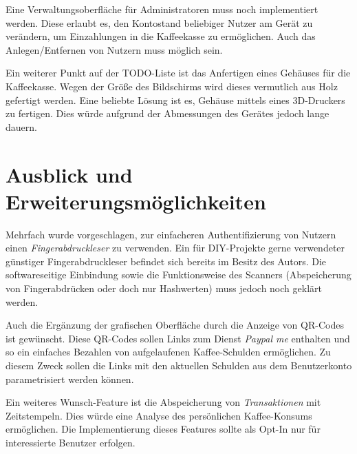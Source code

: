 \documentclass[11pt,a4paper]{IEEEtran}
\begin{document}
Eine Verwaltungsoberfläche für Administratoren muss noch implementiert werden.
Diese erlaubt es, den Kontostand beliebiger Nutzer am Gerät zu verändern, um
Einzahlungen in die Kaffeekasse zu ermöglichen. Auch das Anlegen/Entfernen
von Nutzern muss möglich sein.

Ein weiterer Punkt auf der TODO-Liste ist das Anfertigen eines Gehäuses für die
Kaffeekasse. Wegen der Größe des Bildschirms wird dieses vermutlich aus Holz
gefertigt werden. Eine beliebte Lösung ist es, Gehäuse mittels eines 3D-Druckers
zu fertigen. Dies würde aufgrund der Abmessungen des Gerätes jedoch lange
dauern.

\section{Ausblick und Erweiterungsmöglichkeiten}

Mehrfach wurde vorgeschlagen, zur einfacheren Authentifizierung von Nutzern
einen \emph{Fingerabdruckleser} zu verwenden. Ein für DIY-Projekte gerne 
verwendeter günstiger Fingerabdruckleser befindet sich bereits im Besitz des
Autors. Die softwareseitige Einbindung sowie die Funktionsweise des Scanners
(Abspeicherung von Fingerabdrücken oder doch nur Hashwerten) muss jedoch noch
geklärt werden.

Auch die Ergänzung der grafischen Oberfläche durch die Anzeige von QR-Codes
ist gewünscht. Diese QR-Codes sollen Links zum Dienst \emph{Paypal me}
enthalten und so ein einfaches Bezahlen von aufgelaufenen Kaffee-Schulden
ermöglichen. Zu diesem Zweck sollen die Links mit den aktuellen Schulden
aus dem Benutzerkonto parametrisiert werden können.

Ein weiteres Wunsch-Feature ist die Abspeicherung von \emph{Transaktionen} mit
Zeitstempeln. Dies würde eine Analyse des persönlichen Kaffee-Konsums
ermöglichen. Die Implementierung dieses Features sollte als Opt-In nur für
interessierte Benutzer erfolgen. 

\printbibliography
\end{document}
